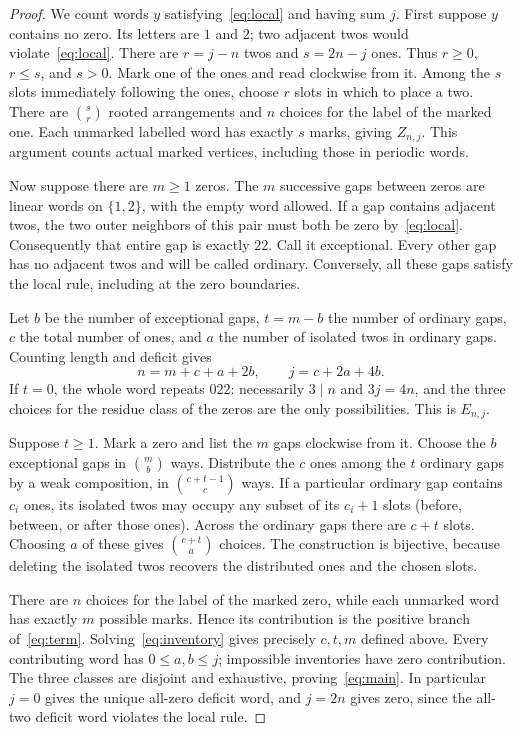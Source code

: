 \documentclass[11pt]{article}
\begin{document}
\begin{proof}
We count words $y$ satisfying~\eqref{eq:local} and having sum $j$.
First suppose $y$ contains no zero. Its letters are $1$ and $2$;
two adjacent twos would violate~\eqref{eq:local}. There are $r=j-n$
twos and $s=2n-j$ ones. Thus $r\geq0$, $r\leq s$, and $s>0$.
Mark one of the ones and read clockwise from it. Among the $s$ slots
immediately following the ones, choose $r$ slots in which to place a two.
There are $\binom sr$ rooted arrangements and $n$ choices for the
label of the marked one. Each unmarked labelled word has exactly $s$
marks, giving $Z_{n,j}$. This argument counts actual marked vertices,
including those in periodic words.

Now suppose there are $m\geq1$ zeros. The $m$ successive gaps between
zeros are linear words on $\{1,2\}$, with the empty word allowed.
If a gap contains adjacent twos, the two outer neighbors of this pair
must both be zero by~\eqref{eq:local}. Consequently that entire gap
is exactly $22$. Call it exceptional. Every other gap has no adjacent
twos and will be called ordinary. Conversely, all these gaps satisfy
the local rule, including at the zero boundaries.

Let $b$ be the number of exceptional gaps, $t=m-b$ the number of ordinary
gaps, $c$ the total number of ones, and $a$ the number of isolated twos
in ordinary gaps. Counting length and deficit gives
\begin{equation}\label{eq:inventory}
 n=m+c+a+2b,\qquad j=c+2a+4b.
\end{equation}
If $t=0$, the whole word repeats $022$: necessarily $3\mid n$ and
$3j=4n$, and the three choices for the residue class of the zeros are
the only possibilities. This is $E_{n,j}$.

Suppose $t\geq1$. Mark a zero and list the $m$ gaps clockwise from it.
Choose the $b$ exceptional gaps in $\binom mb$ ways. Distribute the
$c$ ones among the $t$ ordinary gaps by a weak composition, in
$\binom{c+t-1}{c}$ ways. If a particular ordinary gap contains $c_i$
ones, its isolated twos may occupy any subset of its $c_i+1$ slots
(before, between, or after those ones). Across the ordinary gaps there
are $c+t$ slots. Choosing $a$ of these gives $\binom{c+t}{a}$ choices.
The construction is bijective, because deleting the isolated twos
recovers the distributed ones and the chosen slots.

There are $n$ choices for the label of the marked zero, while each
unmarked word has exactly $m$ possible marks. Hence its contribution is
the positive branch of~\eqref{eq:term}. Solving~\eqref{eq:inventory}
gives precisely $c,t,m$ defined above. Every contributing word has
$0\leq a,b\leq j$; impossible inventories have zero contribution.
The three classes are disjoint and exhaustive, proving~\eqref{eq:main}.
In particular $j=0$ gives the unique all-zero deficit word, and $j=2n$
gives zero, since the all-two deficit word violates the local rule.
\end{proof}
\end{document}
